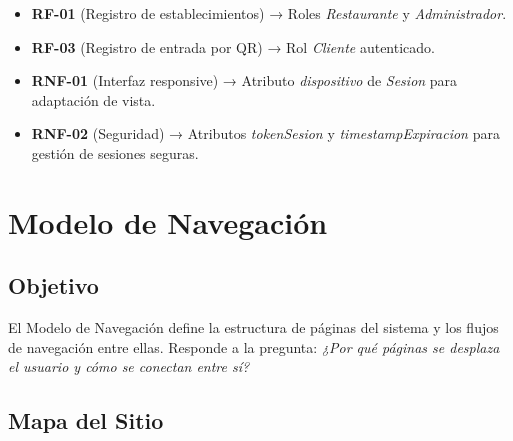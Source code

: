 \begin{itemize}
    \item \textbf{RF-01} (Registro de establecimientos) → Roles \textit{Restaurante} y \textit{Administrador}.
    \item \textbf{RF-03} (Registro de entrada por QR) → Rol \textit{Cliente} autenticado.
    \item \textbf{RNF-01} (Interfaz responsive) → Atributo \textit{dispositivo} de \textit{Sesion} para adaptación de vista.
    \item \textbf{RNF-02} (Seguridad) → Atributos \textit{tokenSesion} y \textit{timestampExpiracion} para gestión de sesiones seguras.
\end{itemize}

\section{Modelo de Navegación}

\subsection{Objetivo}
El Modelo de Navegación define la estructura de páginas del sistema y los flujos de navegación entre ellas. Responde a la pregunta: \textit{¿Por qué páginas se desplaza el usuario y cómo se conectan entre sí?}

\subsection{Mapa del Sitio}

